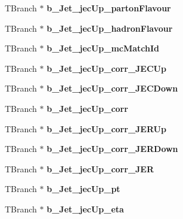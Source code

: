 \begin{DoxyCompactItemize}
T\+Branch $\ast$ {\bfseries b\+\_\+\+Jet\+\_\+jec\+Up\+\_\+parton\+Flavour}
\item 
\hypertarget{classMiniTree_ae96f169264c88f0ee078a787dee2274b}{}\label{classMiniTree_ae96f169264c88f0ee078a787dee2274b} 
T\+Branch $\ast$ {\bfseries b\+\_\+\+Jet\+\_\+jec\+Up\+\_\+hadron\+Flavour}
\item 
\hypertarget{classMiniTree_a43d3aa1f548dc7a317b36fb3dd886f6f}{}\label{classMiniTree_a43d3aa1f548dc7a317b36fb3dd886f6f} 
T\+Branch $\ast$ {\bfseries b\+\_\+\+Jet\+\_\+jec\+Up\+\_\+mc\+Match\+Id}
\item 
\hypertarget{classMiniTree_a608e14cbfa072ad7e52b369da2f6b843}{}\label{classMiniTree_a608e14cbfa072ad7e52b369da2f6b843} 
T\+Branch $\ast$ {\bfseries b\+\_\+\+Jet\+\_\+jec\+Up\+\_\+corr\+\_\+\+J\+E\+C\+Up}
\item 
\hypertarget{classMiniTree_a388de560562f14197f6be5fbcaeb1ecd}{}\label{classMiniTree_a388de560562f14197f6be5fbcaeb1ecd} 
T\+Branch $\ast$ {\bfseries b\+\_\+\+Jet\+\_\+jec\+Up\+\_\+corr\+\_\+\+J\+E\+C\+Down}
\item 
\hypertarget{classMiniTree_ac7d44212e7c397c5979cb84ba5c8b7ec}{}\label{classMiniTree_ac7d44212e7c397c5979cb84ba5c8b7ec} 
T\+Branch $\ast$ {\bfseries b\+\_\+\+Jet\+\_\+jec\+Up\+\_\+corr}
\item 
\hypertarget{classMiniTree_af4c5311f37f0fd756d95fb7009c3422c}{}\label{classMiniTree_af4c5311f37f0fd756d95fb7009c3422c} 
T\+Branch $\ast$ {\bfseries b\+\_\+\+Jet\+\_\+jec\+Up\+\_\+corr\+\_\+\+J\+E\+R\+Up}
\item 
\hypertarget{classMiniTree_a0eeb3c1929e779cc4552303dd783ed27}{}\label{classMiniTree_a0eeb3c1929e779cc4552303dd783ed27} 
T\+Branch $\ast$ {\bfseries b\+\_\+\+Jet\+\_\+jec\+Up\+\_\+corr\+\_\+\+J\+E\+R\+Down}
\item 
\hypertarget{classMiniTree_a5b3d1c85c7e86c65157ceb74b9e1c967}{}\label{classMiniTree_a5b3d1c85c7e86c65157ceb74b9e1c967} 
T\+Branch $\ast$ {\bfseries b\+\_\+\+Jet\+\_\+jec\+Up\+\_\+corr\+\_\+\+J\+ER}
\item 
\hypertarget{classMiniTree_a299859035d17bf88e87cb05a9afd6624}{}\label{classMiniTree_a299859035d17bf88e87cb05a9afd6624} 
T\+Branch $\ast$ {\bfseries b\+\_\+\+Jet\+\_\+jec\+Up\+\_\+pt}
\item 
\hypertarget{classMiniTree_aeb383a7f860742c33a6c3dcdb5d04140}{}\label{classMiniTree_aeb383a7f860742c33a6c3dcdb5d04140} 
T\+Branch $\ast$ {\bfseries b\+\_\+\+Jet\+\_\+jec\+Up\+\_\+eta}
\item 
\hypertarget{classMiniTree_afe162bb81b742e8c5ed466218ae14552}{}\label{classMiniTree_afe162bb81b742e8c5ed466218ae14552} 

\end{DoxyCompactItemize}
